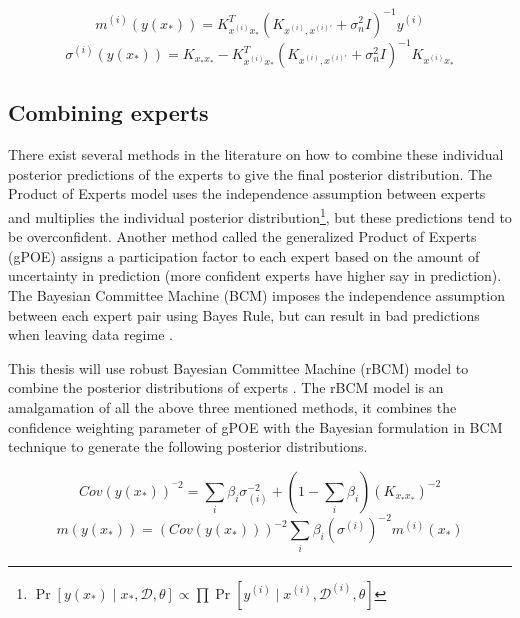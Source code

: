 \begin{equation}\label{eqPredictiveMeanIndividualExpert}
  m^{(i)}(y(x_{*})) = K_{x^{(i)}x_{*}}^{T}( K_{x^{(i)}, x^{(i)'}} + \sigma^{2}_{n}I)^{-1}y^{(i)}
  \end{equation}
\begin{equation}\label{eqPredictiveCovarianceIndividualExpert}
	\sigma^{(i)}(y(x_{*})) = K_{x_{*}x_{*}} - K_{x^{(i)}x_{*}}^{T}( K_{x^{(i)}, x^{(i)'}} + \sigma^{2}_{n}I )^{-1} K_{x^{(i)}x_{*}}
  \end{equation}

\subsection{Combining experts}\label{subSecCombiningExperts}
There exist several methods in the literature on how to combine these individual posterior predictions of the experts to give the final posterior distribution. The Product of Experts model uses the independence assumption between experts and multiplies the individual posterior distribution\footnote{\(\Pr[y(x_{*}) \mid x_{*}, \mathcal{D}, \theta] \propto \prod \Pr[y^{(i)} \mid x^{(i)}, \mathcal{D}^{(i)}, \theta]\)}, but these predictions tend to be overconfident. Another method called the generalized Product of Experts (gPOE) assigns a participation factor to each expert based on the amount of uncertainty in prediction (more confident experts have higher say in prediction)\cite{cao2014generalized}. The Bayesian Committee Machine (BCM) imposes the independence assumption between each expert pair using Bayes Rule, but can result in bad predictions when leaving data regime \cite{tresp2000bayesian}. 

This thesis will use robust Bayesian Committee Machine (rBCM) model to combine the posterior distributions of experts \cite{deisenroth2015distributed}. The rBCM model is an amalgamation of all the above three mentioned methods, it combines the confidence weighting parameter of gPOE with the Bayesian formulation in BCM technique to generate the following posterior distributions.

\begin{equation}\label{eqCovarianceDGP}
    Cov(y(x_{*}))^{^-2} = \sum_{i} \beta_{i}\sigma_{(i)}^{-2} + (1- \sum_{i} \beta_{i})(K_{x_{*}x_{*}})^{-2}
\end{equation}
\begin{equation}\label{eqMeanDGP}
    m(y(x_{*})) = (Cov(y(x_{*})))^{-2}\sum_{i} \beta_{i}(\sigma^{(i)})^{-2}m^{(i)}(x_{*})
\end{equation}

